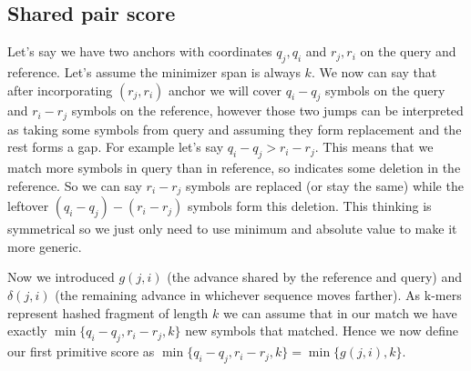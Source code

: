 

\subsection{Shared pair score}
\label{sec:chaining-score-model}

Let's say we have two anchors with coordinates $q_j, q_i$ and $r_j, r_i$ on the query and reference.
Let's assume the minimizer span is always $k$. We now can say that after incorporating $(r_j, r_i)$ anchor we will cover $q_i-q_j$ symbols on the query and $r_i-r_j$ symbols on the reference, however those two jumps can be interpreted as
taking some symbols from query and assuming they form replacement and the rest forms a gap. For example let's say $q_i-q_j > r_i-r_j$. This means that we match more symbols in query than in reference, so indicates some deletion in the reference.
So we can say $r_i-r_j$ symbols are replaced (or stay the same) while the leftover $(q_i-q_j)-(r_i-r_j)$ symbols form this deletion. This thinking is symmetrical so we just only need to use minimum and absolute value to make it more generic.

Now we introduced $g(j,i)$ (the advance shared by the reference and query) and $\delta(j,i)$ (the remaining advance in whichever sequence moves farther).
As k-mers represent hashed fragment of length $k$ we can assume that in our match we have exactly $\min\{q_i-q_j, r_i-r_j, k\}$ new symbols that matched.
Hence we now define our first primitive score as $\min\{q_i-q_j, r_i-r_j, k\} = \min\{g(j,i), k\}$.

